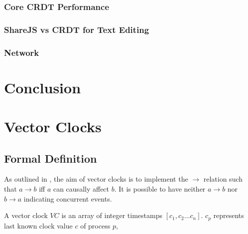 \documentclass[12pt,a4paper,twoside,openright]{report}
\begin{document}
			\subsubsection{}
		
		\subsection{Core CRDT Performance}
		
		\subsection{ShareJS vs CRDT for Text Editing}
		
		\subsection{Network}
		
		
		
		
		
		


\chapter{Conclusion}



\printbibliography

\appendix

\chapter{Vector Clocks}

\section{Formal Definition}
\label{appendix:vectorclocks}

As outlined in \cite{fidge1987}, the aim of vector clocks is to implement the $\rightarrow$ relation such that $ a \rightarrow b$ iff $a$ can causally affect $b$. It is possible to have neither $a \rightarrow b$ nor $b \rightarrow a$ indicating concurrent events.

A vector clock $VC$ is an array of integer timestamps $[c_1, c_2...c_n]$. $c_p$ represents last known clock value $c$ of process $p$, 
\end{document}
